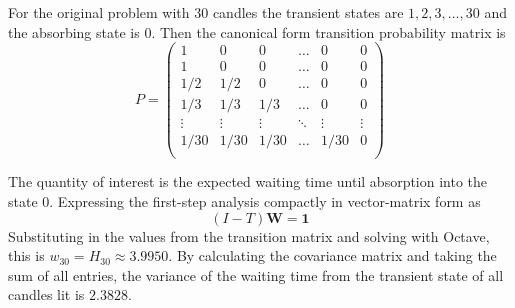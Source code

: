 \documentclass[12pt]{article}
\begin{document}
\begin{example}
    For the original problem with \( 30 \) candles the transient states
    are \( 1, 2, 3, \dots, 30 \) and the absorbing state is \( 0 \).
    Then the canonical form transition probability matrix is
    \[
        P =
        \begin{pmatrix}
            1 & 0 & 0 & \ldots & 0 & 0 \\            
            1 & 0 & 0 & \ldots & 0 & 0 \\
            1/2 & 1/2 & 0 & \ldots & 0 & 0 \\
            1/3 & 1/3 & 1/3 & \ldots & 0 & 0 \\
            \vdots & \vdots & \vdots & \ddots & \vdots & \vdots \\
            1/30 & 1/30 & 1/30 & \ldots & 1/30 & 0 \\
        \end{pmatrix}
    \]

    The quantity of interest is the expected waiting time until
    absorption into the state \( 0 \).  Expressing the first-step
    analysis compactly in vector-matrix form as
    \[
        (I - T) \mathbf{W} = \mathbf{1}
    \] Substituting in the values from the transition matrix and solving
    with Octave, this is \( w_{30} = H_{30} \approx 3.9950 \).
    By calculating the covariance matrix and taking the sum of all
    entries,  the variance of the waiting time from the
    transient state of all candles lit is \( 2.3828 \).
\end{example}
\end{document}
